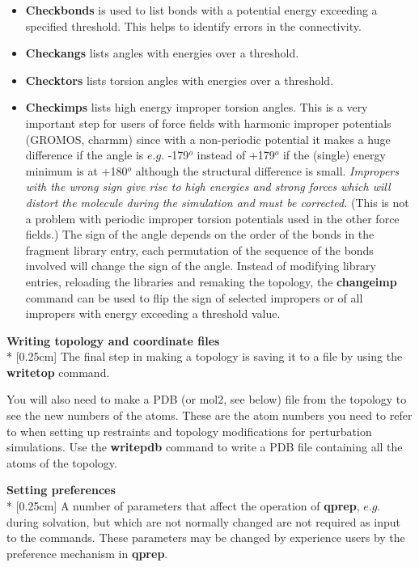 \documentclass[a4paper,10pt]{article}
\begin{document}
\begin{itemize}
\item \textbf{Checkbonds} is used to list bonds with a potential energy
exceeding a specified threshold. This helps to identify errors in
the connectivity.
\item \textbf{Checkangs} lists angles with energies over a threshold.
\item \textbf{Checktors} lists torsion angles with energies over a threshold.
\item \textbf{Checkimps}  lists high energy improper torsion angles. This is
a very important step for users of force fields with harmonic
improper potentials (GROMOS, charmm) since with a non-periodic
potential it makes a huge difference if the angle is $e.g.$
-179$^{o}$ instead of +179$^{o}$ if the (single) energy minimum is
at +180$^{o}$ although the structural difference is small.
\textit{Impropers with the wrong sign give rise to high energies
and strong forces which will distort the molecule during the
simulation and must be corrected.} (This is not a problem with
periodic improper torsion potentials used in the other force
fields.) The sign of the angle depends on the order of the bonds
in the fragment library entry, each permutation of the sequence of
the bonds involved will change the sign of the angle. Instead of
modifying library entries, reloading the libraries and remaking
the topology, the \textbf{changeimp} command can be used to flip
the sign of selected impropers or of all impropers with energy
exceeding a threshold value.
\end{itemize}

\textbf{Writing topology and coordinate files}\\*
[0.25cm] The final step in making a topology is saving it to a file by
using the \textbf{writetop} command.

You will also need to make a PDB (or mol2, see below) file from
the topology to see the new numbers of the atoms. These are the
atom numbers you need to refer to when setting up restraints and
topology modifications for perturbation simulations. Use the
\textbf{writepdb} command to write a PDB file containing all the
atoms of the topology.

\textbf{Setting preferences}\label{setting_pref}\\*
[0.25cm]  A  number  of  parameters   that  affect  the  operation  of
\textbf{qprep}, $e.g.$  during solvation,  but which are  not normally
changed are  not required as  input to the commands.  These parameters
may  be changed  by experience  users by  the preference  mechanism in
\textbf{qprep}.
\end{document}
